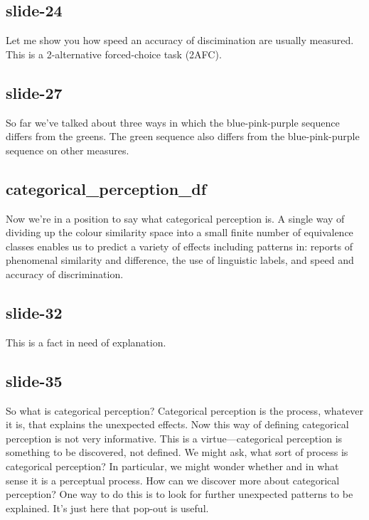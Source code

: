 \documentclass[12pt,\papersize]{extarticle}
\begin{document}
 
\subsection{slide-24}
Let me show you how speed an accuracy of discimination are usually measured.
This is a 2-alternative forced-choice task (2AFC).
 
 
\subsection{slide-27}
So far we've talked about three ways in which the blue-pink-purple sequence differs from the greens.
The green sequence also differs from the blue-pink-purple sequence on other measures.
 
 
\subsection{categorical\_perception\_df}
Now we're in a position to say what categorical perception is.
A single way of dividing up the colour similarity space into a small finite number of equivalence classes enables us to predict a variety of effects including patterns in: reports of phenomenal similarity and difference, the use of linguistic labels, and speed and accuracy of discrimination.
 
 
\subsection{slide-32}
This is a fact in need of explanation.
 
 
\subsection{slide-35}
So what is categorical perception?
Categorical perception is the process, whatever it is, that explains the unexpected effects.
Now this way of defining categorical perception is not very informative.
This is a virtue---categorical perception is something to be discovered, not defined.
We might ask, what sort of process is categorical perception?
In particular, we might wonder whether and in what sense it is a perceptual process.
How can we discover more about categorical perception?
One way to do this is to look for further unexpected patterns to be explained.
It's just here that pop-out is useful.
 
 
\end{document}
